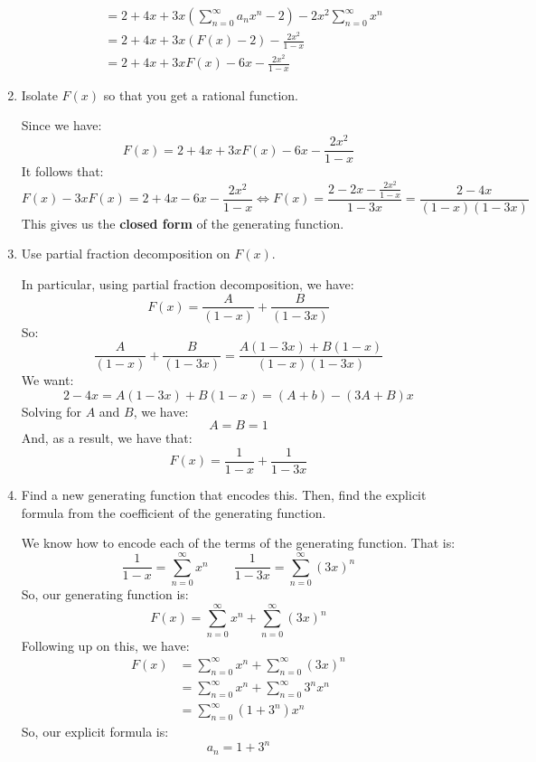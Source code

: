 \documentclass[letterpaper]{article}
\begin{document}
\begin{enumerate}[(1)]
\begin{equation*}
\begin{aligned}
                &= 2 + 4x + 3x \left(\boxed{\sum_{n = 0}^{\infty} a_{n} x^{n}} - 2\right) - \boxed{2x^2 \sum_{n = 0}^{\infty} x^n}\\ 
                &= 2 + 4x + 3x \left(\boxed{F(x)} - 2\right) - \boxed{\frac{2x^2}{1 - x}} \\ 
                &= 2 + 4x + 3xF(x) - 6x - \frac{2x^2}{1 - x}
        \end{aligned}
    \end{equation*}
    \item Isolate $F(x)$ so that you get a rational function. 
    
    \bigskip 

    Since we have:
    \[F(x) = 2 + 4x + 3xF(x) - 6x - \frac{2x^2}{1 - x}\]
    It follows that: 
    \[F(x) - 3xF(x) = 2 + 4x - 6x - \frac{2x^2}{1 - x} \iff F(x) = \frac{2 - 2x - \frac{2x^2}{1 - x}}{1 - 3x} = \boxed{\frac{2 - 4x}{(1 - x)(1 - 3x)}}\]
    This gives us the \textbf{closed form} of the generating function. 

    \item Use partial fraction decomposition on $F(x)$. 
    
    \bigskip 
    
    In particular, using partial fraction decomposition, we have:
    \[F(x) = \frac{A}{(1 - x)} + \frac{B}{(1 - 3x)}\]
    So:
    \[\frac{A}{(1 - x)} + \frac{B}{(1 - 3x)} = \frac{A(1 - 3x) + B(1 - x)}{(1 - x)(1 - 3x)}\]
    We want:
    \[2 - 4x = A(1 - 3x) + B(1 - x) = (A + b) - (3A + B)x\]
    Solving for $A$ and $B$, we have:
    \[A = B = 1\]
    And, as a result, we have that:
    \[F(x) = \frac{1}{1 - x} + \frac{1}{1 - 3x}\]

    \item Find a new generating function that encodes this. Then, find the explicit formula from the coefficient of the generating function. 
    
    \bigskip 
    
    We know how to encode each of the terms of the generating function. That is:
    \[\frac{1}{1 - x} = \sum_{n = 0}^{\infty} x^n \qquad \frac{1}{1 - 3x} = \sum_{n = 0}^{\infty} (3x)^n\]
    So, our generating function is:
    \[F(x) = \sum_{n = 0}^{\infty} x^n + \sum_{n = 0}^{\infty} (3x)^n\] 
    Following up on this, we have:
    \begin{equation*}
        \begin{aligned}
            F(x) &= \sum_{n = 0}^{\infty} x^n + \sum_{n = 0}^{\infty} (3x)^n \\ 
                &= \sum_{n = 0}^{\infty} x^n + \sum_{n = 0}^{\infty} 3^n x^n \\ 
                &= \sum_{n = 0}^{\infty} \boxed{(1 + 3^n)} x^n
        \end{aligned}
    \end{equation*}
    So, our explicit formula is:
    \[a_n = 1 + 3^n\]
\end{enumerate}
\end{document}
